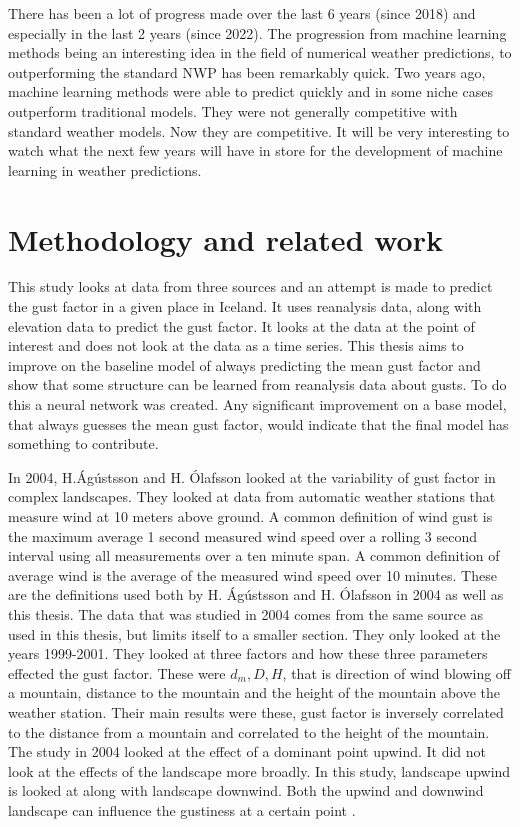 There has been a lot of progress made over the last 6 years (since 2018) and especially in the last 2 years (since 2022). The progression from machine learning methods being an interesting idea in the field of numerical weather predictions, to outperforming the standard NWP has been remarkably quick. Two years ago, machine learning methods were able to predict quickly and in some niche cases outperform traditional models. They were not generally competitive with standard weather models. Now they are competitive. It will be very interesting to watch what the next few years will have in store for the development of machine learning in weather predictions.

\section{Methodology and related work}
This study looks at data from three sources and an attempt is made to predict the gust factor in a given place in Iceland. It uses reanalysis data, along with elevation data to predict the gust factor. It looks at the data at the point of interest and does not look at the data as a time series. This thesis aims to improve on the baseline model of always predicting the mean gust factor and show that some structure can be learned from reanalysis data about gusts. To do this a neural network was created. Any significant improvement on a base model, that always guesses the mean gust factor, would indicate that the final model has something to contribute.

In 2004, H.Ágústsson and H. Ólafsson looked at the variability of gust factor in complex landscapes. They looked at data from automatic weather stations that measure wind at 10 meters above ground. A common definition of wind gust is the maximum average 1 second measured wind speed over a rolling 3 second interval using all measurements over a ten minute span. A common definition of average wind is the average of the measured wind speed over 10 minutes. These are the definitions used both by H. Ágústsson and H. Ólafsson in 2004 as well as this thesis. The data that was studied in 2004 comes from the same source as used in this thesis, but limits itself to a smaller section. They only looked at the years 1999-2001. They looked at three factors and how these three parameters effected the gust factor. These were $d_m, D, H$, that is direction of wind blowing off a mountain, distance to the mountain and the height of the mountain above the weather station. Their main results were these, gust factor is inversely correlated to the distance from a mountain and correlated to the height of the mountain. The study in 2004 looked at the effect of a dominant point upwind. It did not look at the effects of the landscape more broadly. In this study, landscape upwind is looked at along with landscape downwind. Both the upwind and downwind landscape can influence the gustiness at a certain point \cite{GNP_vidtal}.

